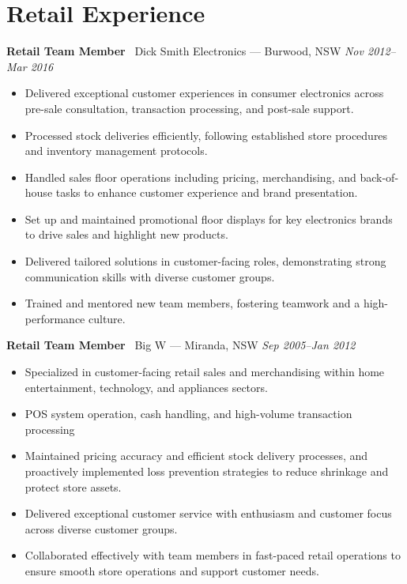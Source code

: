 \documentclass[a4paper,10pt]{article}
\begin{document}
\section*{Retail Experience}
\textbf{Retail Team Member} \textbar\ Dick Smith Electronics --- Burwood, NSW \hfill \textit{Nov 2012--Mar 2016}
\begin{itemize}[nosep,leftmargin=*,topsep=0pt,partopsep=0pt,itemsep=2pt]
\item Delivered exceptional customer experiences in consumer electronics across pre-sale consultation, transaction processing, and post-sale support.
\item Processed stock deliveries efficiently, following established store procedures and inventory management protocols.
\item Handled sales floor operations including pricing, merchandising, and back-of-house tasks to enhance customer experience and brand presentation.
\item Set up and maintained promotional floor displays for key electronics brands to drive sales and highlight new products.
\item Delivered tailored solutions in customer-facing roles, demonstrating strong communication skills with diverse customer groups.
\item Trained and mentored new team members, fostering teamwork and a high-performance culture.
\end{itemize}
\textbf{Retail Team Member} \textbar\ Big W --- Miranda, NSW \hfill \textit{Sep 2005--Jan 2012}
\begin{itemize}[nosep,leftmargin=*,topsep=0pt,partopsep=0pt,itemsep=2pt]
\item Specialized in customer-facing retail sales and merchandising within home entertainment, technology, and appliances sectors.
\item POS system operation, cash handling, and high-volume transaction processing
\item Maintained pricing accuracy and efficient stock delivery processes, and proactively implemented loss prevention strategies to reduce shrinkage and protect store assets.
\item Delivered exceptional customer service with enthusiasm and customer focus across diverse customer groups.
\item Collaborated effectively with team members in fast-paced retail operations to ensure smooth store operations and support customer needs.
\end{itemize}
\end{document}
